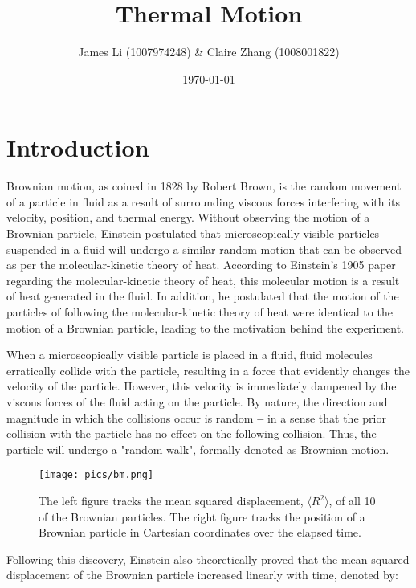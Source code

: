 \documentclass[12pt, letterpaper, twoside]{article}
\title{\textbf{Thermal Motion}}
\author{James Li (1007974248) & Claire Zhang (1008001822)}\vspace{-2em}
\date{\today}
\begin{document}
\maketitle

\linespread{1}

\section{Introduction}

Brownian motion, as coined in 1828 by Robert Brown, is the random movement of a particle in fluid as a result of surrounding viscous forces interfering with its velocity, position, and thermal energy. Without observing the motion of a Brownian particle, Einstein postulated that microscopically visible particles suspended in a fluid will undergo a similar random motion that can be observed as per the molecular-kinetic theory of heat. According to Einstein's 1905 paper regarding the molecular-kinetic theory of heat, this molecular motion is a result of heat generated in the fluid. In addition, he postulated that the motion of the particles of following the molecular-kinetic theory of heat were identical to the motion of a Brownian particle, leading to the motivation behind the experiment.

When a microscopically visible particle is placed in a fluid, fluid molecules erratically collide with the particle, resulting in a force that evidently changes the velocity of the particle. However, this velocity is immediately dampened by the viscous forces of the fluid acting on the particle. By nature, the direction and magnitude in which the collisions occur is random \textbf{--} in a sense that the prior collision with the particle has no effect on the following collision. Thus, the particle will undergo a "random walk", formally denoted as Brownian motion.

\begin{figure}[!ht]
    \centering
    \texttt{[image: pics/bm.png]}
    \caption{The left figure tracks the mean squared displacement, $\langle R^2 \rangle$, of all 10 of the Brownian particles. The right figure tracks the position of a Brownian particle in Cartesian coordinates over the elapsed time.}
    \label{fig:my_label}
\end{figure}

Following this discovery, Einstein also theoretically proved that the mean squared displacement of the Brownian particle increased linearly with time, denoted by:
\end{document}
